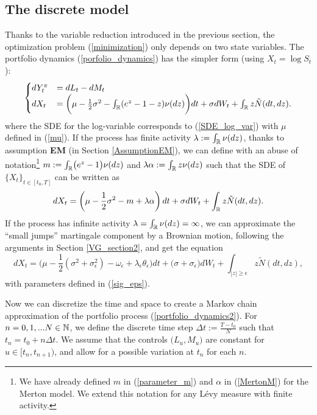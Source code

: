\subsection{The discrete model}\label{discrete_model}

Thanks to the variable reduction introduced in the previous section, the optimization problem (\ref{minimization}) only depends on two state variables. 
The portfolio dynamics (\ref{porfolio_dynamics}) has the simpler form (using $X_t = \log S_t$):
\begin{equation}\label{portfolio_dynamics2}
 \begin{cases}
 dY^{\pi}_t &=  dL_t - dM_t \\
 dX_t &= \biggl( \mu - \frac{1}{2} \sigma^2 - \int_{\mathbb{R}} (e^z-1-z) \nu(dz) \biggr) dt + \sigma dW_t + \int_{\mathbb{R}} z \tilde N (dt,dz).
\end{cases}
\end{equation} 
where the SDE for the log-variable corresponds to (\ref{SDE_log_var}) with $\mu$ defined in (\ref{mu}).
If the process has finite activity $\lambda := \int_{\mathbb{R}} \nu(dz)$, thanks to assumption \textbf{EM} (in Section \ref{AssumptionEM}),
we can define with an abuse of notation\footnote{We have already defined $m$ in (\ref{parameter_m}) and $\alpha$ in (\ref{MertonM}) for the Merton model. 
We extend this notation for any Lévy measure with finite activity.}
$m := \int_{\mathbb{R}} \bigl( e^z -1 \bigr) \nu(dz)$ and $\lambda \alpha := \int_{\mathbb{R}} z \nu(dz)$ such that the SDE of $\{X_t\}_{t \in [t_0,T]}$ can be written as 
\begin{equation}\label{log_sde_fin_act2} 
 dX_t = \biggl( \mu - \frac{1}{2}\sigma^2 -m + \lambda \alpha \biggr) \,dt + \sigma dW_t + \int_{\mathbb{R}} z \tilde N(dt,dz). \\
\end{equation}
If the process has infinite activity $\lambda = \int_{\mathbb{R}} \nu(dz) = \infty$, 
we can approximate the ``small jumps'' martingale component by a Brownian motion, following the arguments in Section \ref{VG_section2}, and get the equation 
\begin{equation}\label{log_sde_inf_act2}
   dX_t = \biggl( \mu - \frac{1}{2} (\sigma^2 + \sigma_{\epsilon}^2) - \omega_{\epsilon} + \lambda_{\epsilon} \theta_{\epsilon}  \biggr) dt + \bigl( \sigma+\sigma_{\epsilon}\bigr) dW_t 
       + \int_{|z|\geq \epsilon} z \tilde N(dt,dz), 
\end{equation}
with parameters defined in (\ref{sig_eps}).

Now we can discretize the time and space to create a Markov chain approximation of the portfolio process (\ref{portfolio_dynamics2}).
For $n = 0,1, ... N \in \mathbb{N}$, we define the discrete time step $ \Delta t := \frac{T - t_0}{N} $ such that
$t_n = t_0 + n \Delta t$.
We assume that the controls $\bigl(L_u,M_u\bigr)$ are constant for $u \in [t_n,t_{n+1})$, and allow for a possible variation at $t_n$ for each $n$.

